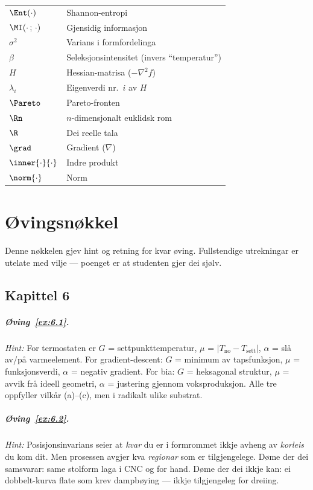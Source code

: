 {\begin{longtable}{@{}p{28mm}p{62mm}@{}}
\addlinespace
$\Ent(\cdot)$ & Shannon-entropi \\
$\MI(\cdot\,;\,\cdot)$ & Gjensidig informasjon \\
$\sigma^2$ & Varians i formfordelinga \\
$\beta$ & Seleksjonsintensitet (invers ``temperatur'') \\
$H$ & Hessian-matrisa ($-\nabla^2 f$) \\
$\lambda_i$ & Eigenverdi nr.~$i$ av $H$ \\
\addlinespace
$\Pareto$ & Pareto-fronten \\
$\Rn$ & $n$-dimensjonalt euklidsk rom \\
$\R$ & Dei reelle tala \\
$\grad$ & Gradient ($\nabla$) \\
$\inner{\cdot}{\cdot}$ & Indre produkt \\
$\norm{\cdot}$ & Norm \\
\end{longtable}
}


\chapter{Øvingsnøkkel}
\label{app:ovingsnokkel}

Denne nøkkelen gjev hint og retning for kvar øving. Fullstendige
utrekningar er utelate med vilje --- poenget er at studenten gjer
dei sjølv.

\section*{Kapittel 6}

\paragraph{Øving~\ref{ex:6.1}.}
\emph{Hint:} For termostaten er $G$ = settpunkttemperatur,
$\mu$ = $|T_{\text{no}} - T_{\text{sett}}|$, $\alpha$ = slå av/på
varmeelement. For gradient-descent: $G$ = minimum av tapsfunksjon,
$\mu$ = funksjonsverdi, $\alpha$ = negativ gradient.
For bia: $G$ = heksagonal struktur, $\mu$ = avvik frå ideell
geometri, $\alpha$ = justering gjennom voksproduksjon. Alle tre
oppfyller vilkår (a)--(c), men i radikalt ulike substrat.

\paragraph{Øving~\ref{ex:6.2}.}
\emph{Hint:} Posisjonsinvarians seier at \emph{kvar} du er i
formrommet ikkje avheng av \emph{korleis} du kom dit. Men
prosessen avgjer kva \emph{regionar} som er tilgjengelege.
Døme der dei samsvarar: same stolform laga i CNC og for hand.
Døme der dei ikkje kan: ei dobbelt-kurva flate som krev dampbøying
--- ikkje tilgjengeleg for dreiing.

